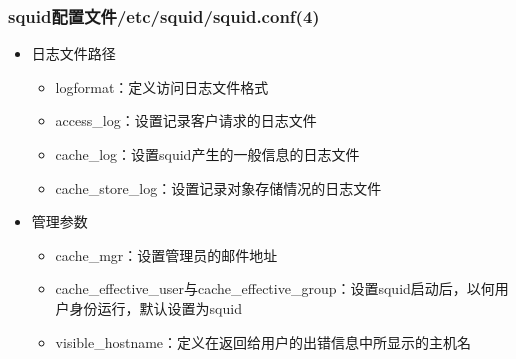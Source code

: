 \documentclass[xcolor=svgnames,presentation]{beamer}
\begin{document}
\begin{frame}
\frametitle{squid配置文件/etc/squid/squid.conf(4)}
\label{sec-4-5}
\begin{itemize}

\item 日志文件路径
\label{sec-4-5-1}%
\begin{itemize}

\item logformat：定义访问日志文件格式
\label{sec-4-5-1-1}%

\item access\_log：设置记录客户请求的日志文件
\label{sec-4-5-1-2}%

\item cache\_log：设置squid产生的一般信息的日志文件
\label{sec-4-5-1-3}%

\item cache\_store\_log：设置记录对象存储情况的日志文件
\label{sec-4-5-1-4}%
\end{itemize} %

\item 管理参数
\label{sec-4-5-2}%
\begin{itemize}

\item cache\_mgr：设置管理员的邮件地址
\label{sec-4-5-2-1}%

\item cache\_effective\_user与cache\_effective\_group：设置squid启动后，以何用户身份运行，默认设置为squid
\label{sec-4-5-2-2}%

\item visible\_hostname：定义在返回给用户的出错信息中所显示的主机名
\label{sec-4-5-2-3}%
\end{itemize} %
\end{itemize} %
\end{frame}
\end{document}
